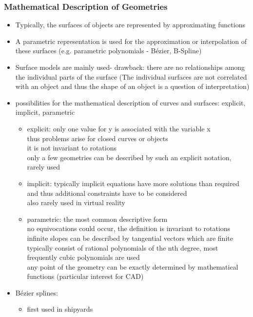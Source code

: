 \documentclass{standalone}
\begin{document}
\subsubsection*{Mathematical Description of Geometries}

\begin{itemize}
	\item Typically, the surfaces of objects are represented by approximating functions
	\item A parametric representation is used for the approximation or interpolation of these surfaces (e.g. parametric polynomials - B\'ezier, B-Spline)
	\item Surface models are mainly used- drawback: there are no relationships among the individual parts of the surface (The individual surfaces are not correlated with an object and thus the shape of an object is a question of interpretation)
	\item possibilities for the mathematical description of curves and surfaces: explicit, implicit, parametric
	\begin{itemize}
		\item explicit: only one value for y is associated with the variable x\\
		thus problems arise for closed curves or objects\\
		it is not invariant to rotations\\
		only a few geometries can be described by such an explicit notation, rarely used
		\item implicit: typically implicit equations have more solutions than required and thus additional constraints have to be considered\\
		also rarely used in virtual reality
		\item parametric: the most common descriptive form\\
		no equivocations could occur, the definition is invariant to rotations\\
		infinite slopes can be described by tangential vectors which are finite\\
		typically consist of rational polynomials of the nth degree, most frequently cubic polynomials are used\\
		any point of the geometry can be exactly determined by mathematical functions (particular interest for CAD)
	\end{itemize}
	\item B\'ezier splines:
	\begin{itemize}
		\item first used in shipyards

\end{itemize}
\end{itemize}
\end{document}
